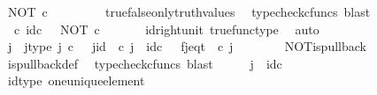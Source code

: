 \begin{isabellebody}
\ {\isachardoublequoteopen}NOT\ {\isasymcirc}\isactrlsub c\ {\isasymt}\ {\isacharequal}{\kern0pt}\ {\isasymt}{\isachardoublequoteclose}\isanewline
\ \ \ \ \isamarkupfalse%
\ true{\isacharunderscore}{\kern0pt}false{\isacharunderscore}{\kern0pt}only{\isacharunderscore}{\kern0pt}truth{\isacharunderscore}{\kern0pt}values\ \isamarkupfalse%
\ {\isacharparenleft}{\kern0pt}typecheck{\isacharunderscore}{\kern0pt}cfuncs{\isacharcomma}{\kern0pt}\ blast{\isacharparenright}{\kern0pt}\isanewline
\ \ \isamarkupfalse%
\ \isamarkupfalse%
\ {\isachardoublequoteopen}{\isasymt}\ {\isasymcirc}\isactrlsub c\ id\isactrlsub c\ {\isasymone}\ {\isacharequal}{\kern0pt}\ NOT\ {\isasymcirc}\isactrlsub c\ {\isasymt}{\isachardoublequoteclose}\isanewline
\ \ \ \ \isamarkupfalse%
\ id{\isacharunderscore}{\kern0pt}right{\isacharunderscore}{\kern0pt}unit{}\ true{\isacharunderscore}{\kern0pt}func{\isacharunderscore}{\kern0pt}type\ \isamarkupfalse%
\ auto\isanewline
\ \ \isamarkupfalse%
\ \isamarkupfalse%
\ j\ \ j{\isacharunderscore}{\kern0pt}type{\isacharcolon}{\kern0pt}\ {\isachardoublequoteopen}j\ {\isasymin}\isactrlsub c\ {\isasymone}{\isachardoublequoteclose}\ \ j{\isacharunderscore}{\kern0pt}id{\isacharcolon}{\kern0pt}\ {\isachardoublequoteopen}{\isasymbeta}\isactrlbsub {\isasymone}\isactrlesub \ {\isasymcirc}\isactrlsub c\ j\ {\isacharequal}{\kern0pt}\ id\isactrlsub c\ {\isasymone}{\isachardoublequoteclose}\ \ f{\isacharunderscore}{\kern0pt}j{\isacharunderscore}{\kern0pt}eq{\isacharunderscore}{\kern0pt}t{\isacharcolon}{\kern0pt}\ {\isachardoublequoteopen}{\isasymf}\ {\isasymcirc}\isactrlsub c\ j\ {\isacharequal}{\kern0pt}\ {\isasymt}{\isachardoublequoteclose}\isanewline
\ \ \ \ \isamarkupfalse%
\ NOT{\isacharunderscore}{\kern0pt}is{\isacharunderscore}{\kern0pt}pullback\ \isamarkupfalse%
\ is{\isacharunderscore}{\kern0pt}pullback{\isacharunderscore}{\kern0pt}def\ \isamarkupfalse%
\ {\isacharparenleft}{\kern0pt}typecheck{\isacharunderscore}{\kern0pt}cfuncs{\isacharcomma}{\kern0pt}\ blast{\isacharparenright}{\kern0pt}\isanewline
\ \ \isamarkupfalse%
\ \isamarkupfalse%
\ {\isachardoublequoteopen}j\ {\isacharequal}{\kern0pt}\ id\isactrlsub c\ {\isasymone}{\isachardoublequoteclose}\isanewline
\ \ \ \ \isamarkupfalse%
\ id{\isacharunderscore}{\kern0pt}type\ one{\isacharunderscore}{\kern0pt}unique{\isacharunderscore}{\kern0pt}element\ \isamarkupfalse%

\end{isabellebody}
